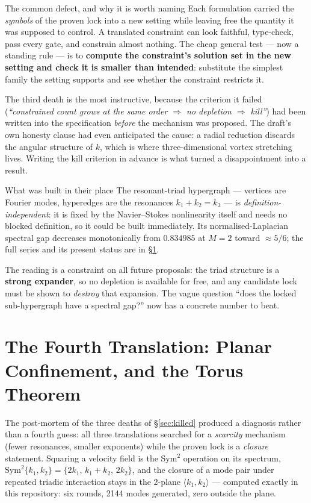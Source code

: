 \documentclass[11pt,a4paper]{article}
\theoremstyle{definition}
\theoremstyle{plain}
\begin{document}
\begin{keybox}{The common defect, and why it is worth naming}
Each formulation carried the \emph{symbols} of the proven lock into a new setting while leaving
free the quantity it was supposed to control. A translated constraint can look faithful,
type-check, pass every gate, and constrain almost nothing. The cheap general test --- now a
standing rule --- is to \textbf{compute the constraint's solution set in the new setting and
check it is smaller than intended}: substitute the simplest family the setting supports and see
whether the constraint restricts it.

The third death is the most instructive, because the criterion it failed
(\emph{``constrained count grows at the same order $\Rightarrow$ no depletion $\Rightarrow$ kill''})
had been written into the specification \emph{before} the mechanism was proposed. The draft's
own honesty clause had even anticipated the cause: a radial reduction discards the angular
structure of $k$, which is where three-dimensional vortex stretching lives. Writing the kill
criterion in advance is what turned a disappointment into a result.
\end{keybox}

\begin{keybox}{What was built in their place}
The resonant-triad hypergraph --- vertices are Fourier modes, hyperedges are the resonances
$k_1+k_2=k_3$ --- is \emph{definition-independent}: it is fixed by the Navier--Stokes
nonlinearity itself and needs no blocked definition, so it could be built immediately. Its
normalised-Laplacian spectral gap decreases monotonically from $0.834985$ at $M=2$ toward
$\approx5/6$; the full series and its present status are in \S\ref{sec:op2prime}.

The reading is a constraint on all future proposals: the triad structure is a \textbf{strong
expander}, so no depletion is available for free, and any candidate lock must be shown to
\emph{destroy} that expansion. The vague question ``does the locked sub-hypergraph have a
spectral gap?'' now has a concrete number to beat.
\end{keybox}

\section{The Fourth Translation: Planar Confinement, and the Torus Theorem}
\label{sec:op2prime}

The post-mortem of the three deaths of \S\ref{sec:killed} produced a diagnosis rather than a
fourth guess: all three translations searched for a \emph{scarcity} mechanism (fewer
resonances, smaller exponents) while the proven lock is a \emph{closure} statement. Squaring a
velocity field is the Sym$^2$ operation on its spectrum,
$\mathrm{Sym}^2\{k_1,k_2\}=\{2k_1,\,k_1+k_2,\,2k_2\}$, and the closure of a mode pair under
repeated triadic interaction stays in the 2-plane $\langle k_1,k_2\rangle$ --- computed
exactly in this repository: six rounds, 2144 modes generated, zero outside the plane.
\end{document}
